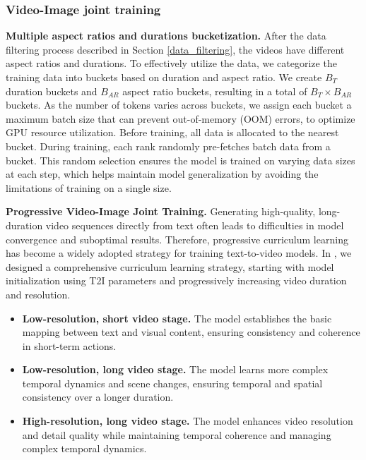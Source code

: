 \subsubsection{Video-Image joint training}

\textbf{Multiple aspect ratios and durations bucketization.}  After the data filtering process described in Section \ref{data_filtering}, the videos have different aspect ratios and durations. To effectively utilize the data, we categorize the training data into buckets based on duration and aspect ratio. We create $B_T$ duration buckets and $B_{AR}$ aspect ratio buckets, resulting in a total of $B_T \times B_{AR}$ buckets. As the number of tokens varies across buckets, we assign each bucket a maximum batch size that can prevent out-of-memory (OOM) errors, to optimize GPU resource utilization. Before training, all data is allocated to the nearest bucket. During training, each rank randomly pre-fetches batch data from a bucket. This random selection ensures the model is trained on varying data sizes at each step, which helps maintain model generalization by avoiding the limitations of training on a single size.

\textbf{Progressive Video-Image Joint Training.} Generating high-quality, long-duration video sequences directly from text often leads to difficulties in model convergence and suboptimal results. Therefore, progressive curriculum learning has become a widely adopted strategy for training text-to-video models. In \nameofmethod{}, we designed a comprehensive curriculum learning strategy, starting with model initialization using T2I parameters and progressively increasing video duration and resolution.

\begin{itemize}
\item \textbf{Low-resolution, short video stage.} The model establishes the basic mapping between text and visual content, ensuring consistency and coherence in short-term actions.

\item \textbf{Low-resolution, long video stage.} The model learns more complex temporal dynamics and scene changes, ensuring temporal and spatial consistency over a longer duration.

\item \textbf{High-resolution, long video stage.} The model enhances video resolution and detail quality while maintaining temporal coherence and managing complex temporal dynamics.
\end{itemize}

